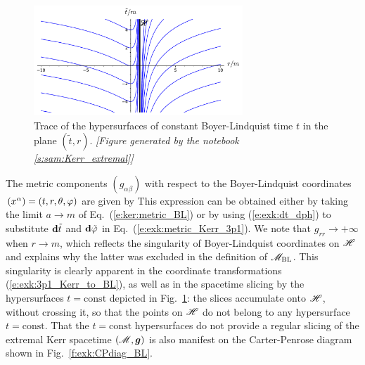 \begin{figure}
\centerline{\includegraphics[width=0.7\textwidth]{exk_BL_slicing.pdf}}
\caption[]{\label{f:exk:BL_slicing} \footnotesize
Trace of the hypersurfaces of constant Boyer-Lindquist time $t$ in the plane
$(\tilde{t}, r)$.
\textsl{[Figure generated by the notebook \ref{s:sam:Kerr_extremal}]}
}
\end{figure}

The metric components $(g_{\alpha\beta})$ with respect to the Boyer-Lindquist coordinates $(x^\alpha) = (t,r,\theta,\varphi)$ are given by
\be \label{e:exk:metric_BL}
\ee
This expression can be obtained either by taking the limit $a\to m$ of Eq.~(\ref{e:ker:metric_BL})
or by using (\ref{e:exk:dt_dph}) to substitute $\mathbf{d}{\tilde t}$ and $\mathbf{d}{\tilde\varphi}$ in Eq.~(\ref{e:exk:metric_Kerr_3p1}).
We note that $g_{rr}\to +\infty$ when $r\to m$, which reflects the singularity of Boyer-Lindquist
coordinates on $\mathscr{H}$ and explains why the latter was excluded in the definition
of $\mathscr{M}_{\rm BL}$. This singularity is clearly apparent in the coordinate transformations
(\ref{e:exk:3p1_Kerr_to_BL}), as well as in the spacetime slicing by the
hypersurfaces $t=\mathrm{const}$ depicted in Fig.~\ref{f:exk:BL_slicing}: the slices accumulate
onto $\mathscr{H}$, without crossing it, so that the points on $\mathscr{H}$ do not belong to any
hypersurface $t=\mathrm{const}$. That the $t=\mathrm{const}$ hypersurfaces do not provide a
regular slicing of the extremal Kerr spacetime $(\mathscr{M},\bm{g})$ is also manifest on
the Carter-Penrose diagram shown in Fig.~\ref{f:exk:CPdiag_BL}.

